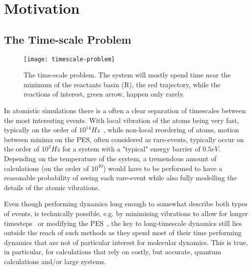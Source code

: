 

\section{Motivation}
\subsection{The Time-scale Problem}
\label{sec:tst-timescale-problem}

\begin{figure}[h]
\begin{center}
\texttt{[image: timescale-problem]}
    \parbox{0.85\linewidth}{
\caption{The time-scale problem.
The system will mostly spend time near the minimum of the reactants basin (R), the red trajectory, while the reactions of interest, green arrow, happen only rarely.}
\label{fig:timescale-problem}
    }
\end{center}
\end{figure}

In atomistic simulations there is a often a clear separation of timescales between the most interesting events.
With local vibration of the atoms being very fast, typically on the order of $10^{14} \unit{Hz}$~\cite{mcquarrie-1983},
while non-local reordering of atoms, motion between minima on the PES, often considered as rare-events, typically occur on the order of $10^3 \unit{Hz}$ for a system with a "typical" energy barrier of $0.5 \unit{eV}$.
Depending on the temperature of the system, a tremendous amount of calculations (on the order of $10^{10}$) would have to be performed to have a reasonable probability of seeing each rare-event while also fully modelling the details of the atomic vibrations.

Even though performing dynamics long enough to somewhat describe both types of events, is technically possible, e.g. by minimising vibrations to allow for longer timesteps~\cite{shake-1977, rattle-1983} or modifying the PES~\cite{hyperdynamics-voter-1997}, the key to long-timescale dynamics still lies outside the reach of such methods as they spend most of their time performing dynamics that are not of particular interest for molecular dynamics.
This is true, in particular, for calculations that rely on costly, but accurate, quantum calculations and/or large systems.

